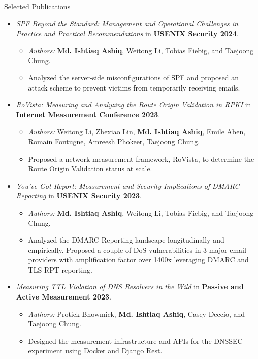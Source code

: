 \documentclass[]{mcdowellcv}
\begin{document}
	\begin{cvsection}{Selected Publications}
		\begin{cvsubsection}{}{}{}
			\begin{itemize}
				\item \textit{SPF Beyond the Standard: Management and Operational Challenges in Practice
and Practical Recommendations} in \textbf{USENIX Security 2024}.
				\begin{itemize}
					\item \textit{Authors:} \textbf{Md. Ishtiaq Ashiq}, Weitong Li, Tobias Fiebig, and Taejoong Chung.
					\item Analyzed the server-side misconfigurations of SPF and proposed an attack scheme to prevent victims from temporarily receiving emails.
				\end{itemize}
				\item \textit{RoVista: Measuring and Analyzing the Route Origin Validation in RPKI} in \textbf{Internet Measurement Conference 2023}.
				\begin{itemize}
					\item \textit{Authors:} Weitong Li, Zhexiao Lin, \textbf{Md. Ishtiaq Ashiq}, Emile Aben, Romain Fontugne, Amreesh Phokeer, Taejoong Chung.
					\item Proposed a network measurement framework, RoVista, to determine the Route Origin Validation status at scale.
				\end{itemize}
				\item \textit{You’ve Got Report: Measurement and Security Implications of DMARC Reporting} in \textbf{USENIX Security 2023}.
				\begin{itemize}
					\item \textit{Authors:} \textbf{Md. Ishtiaq Ashiq}, Weitong Li, Tobias Fiebig, and Taejoong Chung.
					\item Analyzed the DMARC Reporting landscape longitudinally and empirically. Proposed a couple of DoS vulnerabilities
					in 3 major email providers with amplification factor over 1400x leveraging DMARC and TLS-RPT reporting.
				\end{itemize}
				\item \textit{Measuring TTL Violation of DNS Resolvers in the Wild} in \textbf{Passive and Active Measurement 2023}.
				\begin{itemize}
					\item \textit{Authors:} Protick Bhowmick, \textbf{Md. Ishtiaq Ashiq}, Casey Deccio, and Taejoong Chung.
					\item Designed the measurement infrastructure and APIs for the DNSSEC experiment using Docker and Django Rest.

\end{itemize}
\end{itemize}
\end{cvsubsection}
\end{cvsection}
\end{document}
